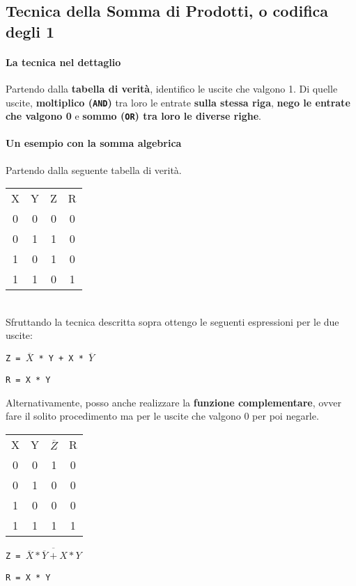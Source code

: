 \documentclass[10pt]{report}
\begin{document}
\subsection{Tecnica della Somma di Prodotti, o codifica degli 1}
\paragraph{La tecnica nel dettaglio} Partendo dalla \textbf{tabella di verità}, identifico le uscite che valgono 1. Di quelle uscite, \textbf{moltiplico (\texttt{AND})} tra loro le entrate \textbf{sulla stessa riga}, \textbf{nego le entrate che valgono 0} e \textbf{sommo (\texttt{OR}) tra loro le diverse righe}.
\paragraph{Un esempio con la somma algebrica} Partendo dalla seguente tabella di verità.\\
\begin{multicols}{2}
\begin{tabular}{cc|c|c}
X & Y & Z & R \\
0 & 0 & 0 & 0 \\
0 & 1 & 1 & 0 \\
1 & 0 & 1 & 0 \\
1 & 1 & 0 & 1\\
\end{tabular}
\columnbreak
\\Sfruttando la tecnica descritta sopra ottengo le seguenti espressioni per le due uscite:
\begin{list}{}{}
\item \texttt{Z = $\overline{X}$ * Y + X * $\overline{Y}$}
\item \texttt{R = X * Y}
\end{list}
\end{multicols}
Alternativamente, posso anche realizzare la \textbf{funzione complementare}, ovver fare il solito procedimento ma per le uscite che valgono 0 per poi negarle.\\
\begin{multicols}{2}
\begin{tabular}{cc|c|c}
X & Y & $\overline{Z}$ & R \\
0 & 0 & 1 & 0 \\
0 & 1 & 0 & 0 \\
1 & 0 & 0 & 0 \\
1 & 1 & 1 & 1\\
\end{tabular}
\columnbreak
\begin{list}{}{}
\item \texttt{Z = $\overline{\overline{X} * \overline{Y} + X * Y}$}
\item \texttt{R = X * Y}
\end{list}
\end{multicols}
\end{document}
